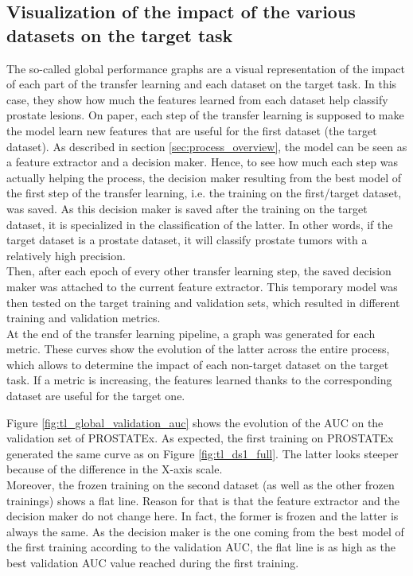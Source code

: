 \subsection{Visualization of the impact of the various datasets on the target task}
\setlength{\marginparwidth}{3cm}\leavevmode {}The so-called global performance graphs are a visual representation of the impact of each part of the transfer learning and each dataset on the target task. In this case, they show how much the features learned from each dataset help classify prostate lesions. On paper, each step of the transfer learning is supposed to make the model learn new features that are useful for the first dataset (the target dataset). As described in section \ref{sec:process_overview}, the model can be seen as a feature extractor and a decision maker. Hence, to see how much each step was actually helping the process, the decision maker resulting from the best model of the first step of the transfer learning, i.e. the training on the first/target dataset, was saved. As this decision maker is saved after the training on the target dataset, it is specialized in the classification of the latter. In other words, if the target dataset is a prostate dataset, it will classify prostate tumors with a relatively high precision.\\
Then, after each epoch of every other transfer learning step, the saved decision maker was attached to the current feature extractor. This temporary model was then tested on the target training and validation sets, which resulted in different training and validation metrics.\\
At the end of the transfer learning pipeline, a graph was generated for each metric. These curves show the evolution of the latter across the entire process, which allows to determine the impact of each non-target dataset on the target task. If a metric is increasing, the features learned thanks to the corresponding dataset are useful for the target one. 

Figure \ref{fig:tl_global_validation_auc} shows the evolution of the AUC on the validation set of PROSTATEx. As expected, the first training on PROSTATEx generated the same curve as on Figure \ref{fig:tl_ds1_full}. The latter looks steeper because of the difference in the X-axis scale.\\
Moreover, the frozen training on the second dataset (as well as the other frozen trainings) shows a flat line. Reason for that is that the feature extractor and the decision maker do not change here. In fact, the former is frozen and the latter is always the same. As the decision maker is the one coming from the best model of the first training according to the validation AUC, the flat line is as high as the best validation AUC value reached during the first training. 

